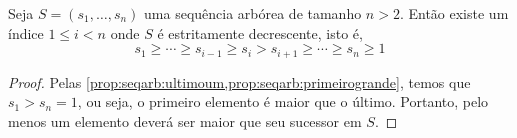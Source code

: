 \begin{corollary}
    Seja $S = (s_1, \ldots, s_n)$ uma sequência arbórea de tamanho $n > 2$. Então existe um índice $1 \leq i < n$ onde $S$ é estritamente decrescente, isto é,
    \[
        s_1 \geq \cdots \geq s_{i-1} \geq s_i > s_{i+1} \geq \cdots \geq s_n \geq 1
    \]
\end{corollary}

\begin{proof}
    Pelas \cref{prop:seqarb:ultimoum,prop:seqarb:primeirogrande}, temos que $s_1 > s_n = 1$, ou seja, o primeiro elemento é maior que o último. Portanto, pelo menos um elemento deverá ser maior que seu sucessor em $S$.
\end{proof}
